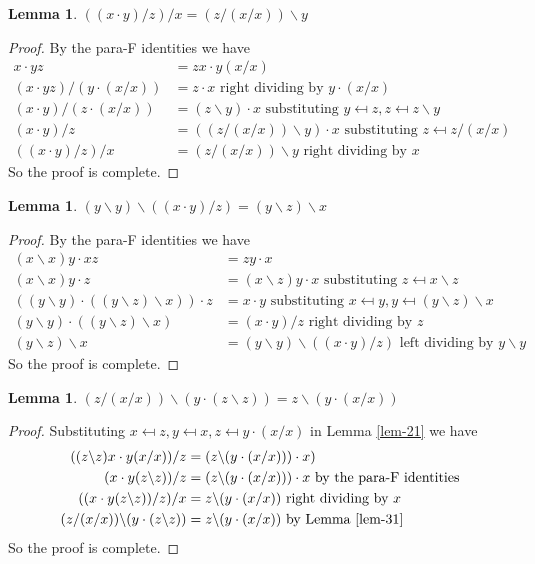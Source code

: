 \documentclass[12pt]{report}
\theoremstyle{definition}
\newtheorem{lem}[thm]{Lemma}
\newcommand{\ldv}{\backslash}       %
\newcommand{\rdv}{/}                %
\begin{document}
\begin{lem}\label{lem-31}
  $((x\cdot y)\rdv z)\rdv x = (z\rdv (x\rdv x))\ldv y$
\end{lem}

\begin{proof}
  By the para-F identities we have
  \begin{align*}
    x\cdot yz &= zx\cdot y(x\rdv x)\\
    (x\cdot yz)\rdv (y\cdot (x\rdv x)) &= z\cdot x\text{ right dividing by $y\cdot (x\rdv x)$}\\
    (x\cdot y)\rdv(z\cdot (x\rdv x)) &= (z\ldv y)\cdot x\text{ substituting $y\mapsfrom z, z\mapsfrom z\ldv y$}\\
    (x\cdot y)\rdv z &= ((z\rdv (x\rdv x))\ldv y)\cdot x\text{ substituting $z\mapsfrom z\rdv (x\rdv x)$}\\
    ((x\cdot y)\rdv z)\rdv x &= (z\rdv (x\rdv x))\ldv y\text{ right dividing by $x$}
  \end{align*}
  So the proof is complete.
\end{proof}

\begin{lem}\label{lem-32}
  $(y\ldv y)\ldv ((x\cdot y)\rdv z) = (y\ldv z)\ldv x$
\end{lem}

\begin{proof}
  By the para-F identities we have
  \begin{align*}
    (x\ldv x)y\cdot xz &= zy\cdot x\\
    (x\ldv x)y\cdot z &= (x\ldv z)y\cdot x\text{ substituting $z\mapsfrom x\ldv z$}\\
    ((y\ldv y)\cdot ((y\ldv z)\ldv x))\cdot z &= x\cdot y\text{ substituting $x\mapsfrom y, y\mapsfrom (y\ldv z)\ldv x$}\\
    (y\ldv y)\cdot ((y\ldv z)\ldv x) &= (x\cdot y)\rdv z\text{ right dividing by $z$}\\
    (y\ldv z)\ldv x &= (y\ldv y)\ldv((x\cdot y)\rdv z)\text{ left dividing by $y\ldv y$}
  \end{align*}
  So the proof is complete.
\end{proof}

\begin{lem}\label{lem-34-f}
  $(z\rdv(x\rdv x))\ldv (y\cdot (z\ldv z)) = z\ldv (y\cdot (x\rdv x))$
\end{lem}

\begin{proof}
  Substituting $x\mapsfrom z, y\mapsfrom x, z\mapsfrom y\cdot(x\rdv x)$ in Lemma \ref{lem-21} we have
  \begin{align*}
    ((z\ldv z)x \cdot y(x\rdv x))\rdv z &= (z\ldv (y\cdot (x\rdv x)))\cdot x)\\
    (x\cdot y(z\ldv z))\rdv z &= (z\ldv (y\cdot (x\rdv x)))\cdot x\text{ by the para-F identities}\\
    ((x\cdot y(z\ldv z))\rdv z)\rdv x &= z\ldv (y\cdot (x\rdv x))\text{ right dividing by $x$}\\
    (z\rdv(x\rdv x))\ldv (y\cdot (z\ldv z)) &= z\ldv (y\cdot (x\rdv x))\text{ by Lemma \ref{lem-31}}
  \end{align*}
  So the proof is complete.
\end{proof}
\end{document}
